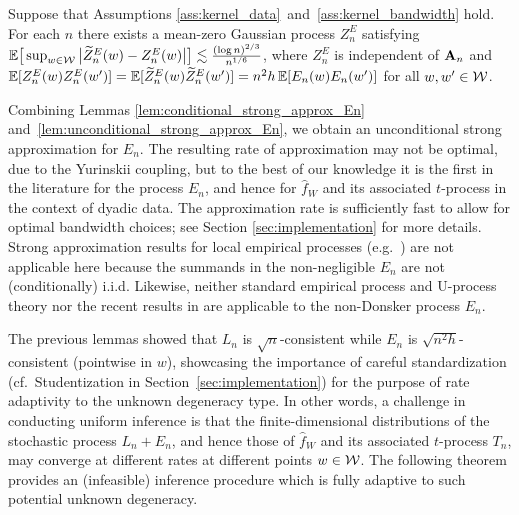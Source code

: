 \begin{lemma}
  \label{lem:unconditional_strong_approx_En}

  Suppose that Assumptions
  \ref{ass:kernel_data}~and~\ref{ass:kernel_bandwidth} hold.
  For each $n$ there exists
  a mean-zero Gaussian process $Z^E_n$ satisfying
  $\mathbb{E}\big[ \sup_{w \in \mathcal{W}} \big|\widetilde Z_n^E(w) - Z_n^E(w)\big| \big]
  \lesssim \frac{(\log n)^{2/3}}{n^{1/6}}$,
  where
  $Z_n^E$ is independent of $\mathbf{A}_n$ and
  $\mathbb{E}[Z_n^E(w)Z_n^E(w')]=\mathbb{E}[\widetilde Z_n^E(w)\widetilde Z_n^E(w')]
  = n^2h \, \mathbb{E}[E_n(w)E_n(w')]$
  for all $w, w' \in \mathcal{W}$.
\end{lemma}


Combining Lemmas \ref{lem:conditional_strong_approx_En}
and~\ref{lem:unconditional_strong_approx_En},
we obtain an unconditional strong approximation for $E_n$.
The resulting rate of approximation may not be optimal,
due to the Yurinskii coupling, but to the best of our knowledge
it is the first in the literature for the process
$E_n$, and hence for $\widehat{f}_W$ and its associated $t$-process in the
context of dyadic data.
The approximation rate is
sufficiently fast to allow for optimal bandwidth choices; see Section
\ref{sec:implementation} for more details.
Strong approximation results for local empirical processes
(e.g.\ \citealp{gine2010confidence})
are not applicable here because the summands in the
non-negligible $E_n$
are not (conditionally) i.i.d.
Likewise, neither standard empirical process and U-process theory
\citep{van1996weak,gine2021mathematical} nor the recent results in
\citet{davezies2021exchangeable} are applicable
to the non-Donsker process $E_n$.

The previous lemmas showed that $L_n$ is
$\sqrt{n}$-consistent while $E_n$ is $\sqrt{n^2h}$-consistent
(pointwise in $w$),
showcasing the importance of careful standardization
(cf.\ Studentization in Section~\ref{sec:implementation})
for the purpose of rate
adaptivity to the unknown degeneracy type.
In other
words, a challenge in conducting uniform inference is that the
finite-dimensional distributions of the stochastic process $L_n+E_n$,
and hence those of $\widehat{f}_W$ and its associated $t$-process $T_n$,
may converge at different rates at different points $w\in\mathcal{W}$.
The following theorem provides an
(infeasible)
inference procedure which is fully adaptive to
such potential unknown degeneracy.


